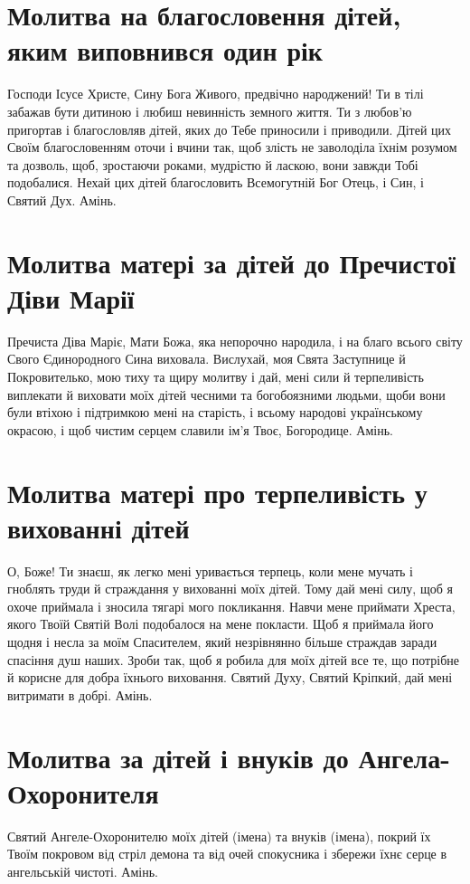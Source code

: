 \documentclass[chapters.tex]{subfiles}
\begin{document}
\section{Молитва на благословення дітей, яким виповнився один рік}
Господи Ісусе Христе, Сину Бога Живого, предвічно народжений! Ти в тілі забажав бути дитиною і любиш невинність земного життя. Ти з любов’ю пригортав і благословляв дітей, яких до Тебе приносили і приводили. Дітей цих Своїм благословенням оточи і вчини так, щоб злість не заволоділа їхнім розумом та дозволь, щоб, зростаючи роками, мудрістю й ласкою, вони завжди Тобі подобалися. Нехай цих дітей благословить Всемогутній Бог Отець, і Син, і Святий Дух. Амінь.

\section{Молитва матері за дітей до Пречистої Діви Марії}
Пречиста Діва Маріє, Мати Божа, яка непорочно народила, і на благо всього світу Свого Єдинородного Сина виховала. Вислухай, моя Свята Заступнице й Покровителько, мою тиху та щиру молитву і дай, мені сили й терпеливість виплекати й виховати моїх дітей чесними та богобоязними людьми, щоби вони були втіхою і підтримкою мені на старість, і всьому народові українському окрасою, і щоб чистим серцем славили ім’я Твоє, Богородице. Амінь.

\section{Молитва матері про терпеливість у вихованні дітей}
О, Боже! Ти знаєш, як легко мені уривається терпець, коли мене мучать і гноблять труди й страждання у вихованні моїх дітей. Тому дай мені силу, щоб я охоче приймала і зносила тягарі мого покликання. Навчи мене приймати Хреста, якого Твоїй Святій Волі подобалося на мене покласти. Щоб я приймала його щодня і несла за моїм Спасителем, який незрівнянно більше страждав заради спасіння душ наших. Зроби так, щоб я робила для моїх дітей все те, що потрібне й корисне для добра їхнього виховання. Святий Духу, Святий Кріпкий, дай мені витримати в добрі. Амінь.

\section{Молитва за дітей і внуків до Ангела-Охоронителя}
Святий Ангеле-Охоронителю моїх дітей (імена) та внуків (імена), покрий їх Твоїм покровом від стріл демона та від очей спокусника і збережи їхнє серце в ангельській чистоті. Амінь.
\end{document}
